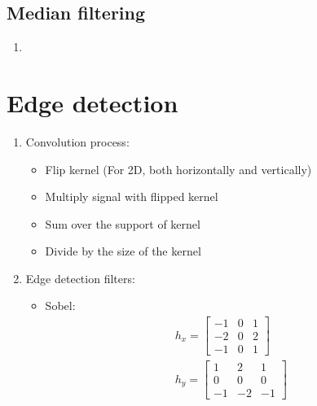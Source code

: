 \documentclass[9pt]{article}
\begin{document}
\begin{multicols*}{2}
        \subsection{Median filtering}
        \begin{enumerate}
            \item 
        \end{enumerate}

    \section{Edge detection}
        \begin{enumerate}
            \item Convolution process:
            \begin{itemize}
                \item Flip kernel (For 2D, both horizontally and vertically)
                \item Multiply signal with flipped kernel 
                \item Sum over the support of kernel
                \item Divide by the size of the kernel
            \end{itemize}
            \item Edge detection filters:
            \begin{itemize}
                \item Sobel:
                {\setlength{\mathindent}{0cm}}
                \begin{gather*}
                    h_{x} = \begin{bmatrix}
                        -1 & 0 & 1 \\
                        -2 & 0 & 2 \\
                        -1 & 0 & 1
                    \end{bmatrix} \\
                    h_{y} = \begin{bmatrix}
                        1 & 2 & 1 \\
                        0 & 0 & 0 \\
                        -1 & -2 & -1
                    \end{bmatrix} 
                \end{gather*}


\end{itemize}
\end{enumerate}
\end{multicols*}
\end{document}
